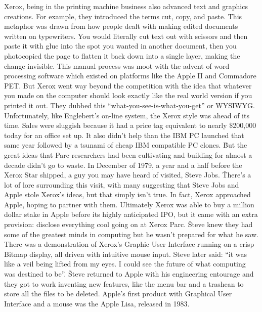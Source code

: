 Xerox, being in the printing machine business also advanced text and graphics creations. For example, they introduced
the terms cut, copy, and paste. This metaphor was drawn from how people dealt with making edited documents written on
typewriters. You would literally cut text out with scissors and then paste it with glue into the spot you wanted in
another document, then you photocopied the page to flatten it back down into a single layer, making the change
invisible. This manual process was moot with the advent of word processing software which existed on platforms like
the Apple II and Commadore PET. But Xerox went way beyond the competition with the idea that whatever you made on the
computer should look exactly like the real world version if you printed it out. They dubbed this
``what-you-see-is-what-you-get'' or WYSIWYG. Unfortunately, like Englebert's on-line system, the Xerox style was
ahead of its time. Sales were sluggish because it had a price tag equivalent to nearly \$200,000 today for an office
set up. It also didn't help than the IBM PC launched that same year followed by a tsunami of cheap IBM compatible PC
clones. \v

But the great ideas that Parc researchers had been cultivating and building for almost a decade didn't go to waste.
In December of 1979, a year and a half before the Xerox Star shipped, a guy you may have heard of visited, Steve Jobs. \v

There's a lot of lore surrounding this visit, with many suggesting that Steve Jobs and Apple stole Xerox's ideas, but
that simply isn't true. In fact, Xerox approached Apple, hoping to partner with them. Ultimately Xerox was able to
buy a million dollar stake in Apple before its highly anticipated IPO, but it came with an extra provision: disclose
everything cool going on at Xerox Parc. \v

Steve knew they had some of the greatest minds in computing but he wasn't prepared for what he saw. There was a
demonstration of Xerox's Graphic User Interface running on a crisp Bitmap display, all driven with intuitive mouse
input. Steve later said: ``it was like a veil being lifted from my eyes. I could see the future of what computing was
destined to be''. \v

Steve returned to Apple with his engineering entourage and they got to work inventing new features, like the menu bar
and a trashcan to store all the files to be deleted. Apple's first product with Graphical User Interface and a mouse
was the Apple Lisa, released in 1983.


